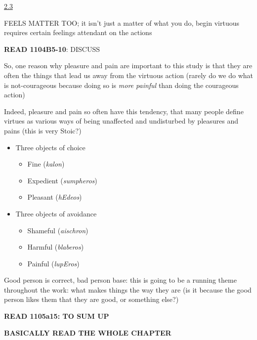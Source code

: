 \documentclass[11pt]{article}
\begin{document}
\noindent\underline{2.3}
\vspace*{2mm}

\noindent FEELS MATTER TOO; it isn't just a matter of what you do, begin virtuous requires certain feelings attendant on the actions
\vspace*{2mm}

\noindent\textbf{READ 1104B5-10}: DISCUSS
\vspace*{2mm}

\noindent So, one reason why pleasure and pain are important to this study is that they are often the things that lead us away from the virtuous action (rarely do we do what is not-courageous because doing so is \emph{more painful} than doing the courageous action)
\vspace*{2mm}

\noindent Indeed, pleasure and pain so often have this tendency, that many people define virtues as various ways of being unaffected and undisturbed by pleasures and pains (this is very Stoic?)

\begin{itemize}\item{Three objects of choice}

\begin{itemize}\item{Fine (\emph{kalon})}\item{Expedient (\emph{sumpheros})}\item{Pleasant (\emph{hEdeos})}\end{itemize}\item{Three objects of avoidance}\begin{itemize}\item{Shameful (\emph{aischron})}\item{Harmful (\emph{blaberos})}\item{Painful (\emph{lupEros})}\end{itemize}\end{itemize}

\noindent Good person is correct, bad person base: this is going to be a running theme throughout the work: what makes things the way they are (is it because the good person likes them that they are good, or something else?)
\vspace*{2mm}

\noindent\textbf{READ 1105a15: TO SUM UP}
\vspace*{4mm}

\noindent\textbf{BASICALLY READ THE WHOLE CHAPTER}
\end{document}
